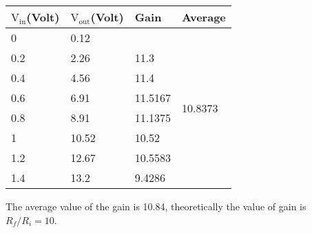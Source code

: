 \documentclass[12pt]{article}
\begin{document}
\begin{table}[H]
	\centering
	\begin{tabular}{|l|l|l|l|}
		\hline
		$\mathrm{V_{in}}$(Volt) & $\mathrm{V_{out}}$(Volt) & Gain             & Average                            \\ \hline \hline
		0            & 0.12          &         & \multirow{8}{*}{10.8373} \\ \cline{1-3}
		0.2          & 2.26          & 11.3    &                                   \\ \cline{1-3}
		0.4          & 4.56          & 11.4    &                                   \\ \cline{1-3}
		0.6          & 6.91          & 11.5167 &                                   \\ \cline{1-3}
		0.8          & 8.91          & 11.1375 &                                   \\ \cline{1-3}
		1            & 10.52         & 10.52   &                                   \\ \cline{1-3}
		1.2          & 12.67         & 10.5583 &                                   \\ \cline{1-3}
		1.4          & 13.2          & 9.4286  &                                   \\ \hline
	\end{tabular}
\end{table}
The average value of the gain is 10.84, theoretically the value of gain is $ R_f / R_i = 10 $. 
\end{document}

